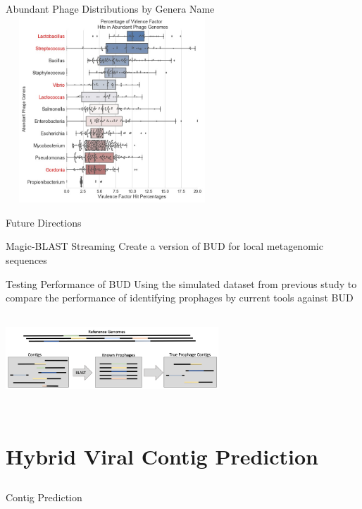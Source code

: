 \documentclass[11pt]{beamer}
\begin{document}
	\begin{frame}{Abundant Phage Distributions by Genera Name}
	\centering
	\includegraphics[height=7cm, width=8cm]{Top_Phages_Plots.jpg}
	
	\end{frame}
	
	
	\begin{frame}{Future Directions}
	\begin{block}{Magic-BLAST Streaming}
	Create a version of BUD for local metagenomic sequences 
	\end{block}
	
	\begin{block}{Testing Performance of BUD}
	Using the simulated dataset from previous study to compare the performance of identifying prophages by current tools against BUD
	\center
	\includegraphics[height=4cm, width=8cm]{fig.png}
	
	\end{block}
	\end{frame}
	
	
\section{Hybrid Viral Contig Prediction}
\subsection{}
	\begin{frame}{Contig Prediction}

	\end{frame}
	
\end{document}

